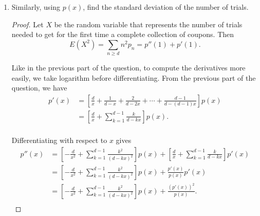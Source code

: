 \documentclass{article}
\begin{document}
\begin{enumerate}[label={(\alph*)}]
\begin{proof}
        Multiplying with $p(x)$ and substituting with $x=1$ give
        \begin{align*}
          \mu_d=p'(1) &=\left[\frac{d}{1} +\frac{1}{d-1} +\frac{2}{d-2}
            +\cdots +\frac{d-1}{d-(d-1)} \right] p(1)\\
          &=\left[d +\sum_{k-1}^{d-1} \frac{k}{d-k}\right] \cdot
            \frac{(d-1)!}{(d-2)(d-1)\cdots2\cdot1}\\
          &=d +\sum_{k=1}^{d-1} \frac{k}{d-k}\\
          &=d +d\sum_{k=1}^{d-1} \frac{1}{d-k} -\sum_{k=1}^{d-1}1\\
          &=1 +d\sum_{k=1}^{d-1} \frac{1}{k}\\
          &=d\sum_{k=1}^{d} \frac{1}{k}\\
          &=dH_d.\\
        \end{align*}
      \end{proof}

    \item Similarly, using $p(x)$, find the standard deviation of the
      number of trials.

      \begin{proof}
        Let $X$ be the random variable that represents the number of trials
        needed to get for the first time a complete collection of coupons.
        Then
        \[E(X^2) =\sum_{n\geq d} n^2p_n =p''(1)+p'(1).\]

        Like in the previous part of the question, to compute the
        derivatives more easily, we take logarithm before differentiating.
        From the previous part of the question, we have
        \begin{align*}
          p'(x) &=\left[\frac{d}{x} +\frac{1}{d-x} +\frac{2}{d-2x}
            +\cdots +\frac{d-1}{d-(d-1)x} \right] p(x)\\
          &=\left[\frac{d}{x} +\sum_{k=1}^{d-1} \frac{k}{d-kx}\right]
            p(x).\\
        \end{align*}

        Differentiating with respect to $x$ gives
        \begin{align*}
          p''(x) &=\left[-\frac{d}{x^2} +\sum_{k=1}^{d-1}
            \frac{k^2}{(d-kx)^2}\right] p(x) + \left[\frac{d}{x}
            +\sum_{k=1}^{d-1} \frac{k}{d-kx}\right] p'(x)\\
          &=\left[-\frac{d}{x^2} +\sum_{k=1}^{d-1}
            \frac{k^2}{(d-kx)^2}\right] p(x) + \frac{p'(x)}{p(x)} p'(x)\\
          &=\left[-\frac{d}{x^2} +\sum_{k=1}^{d-1}
            \frac{k^2}{(d-kx)^2}\right] p(x) + \frac{(p'(x))^2}{p(x)}.\\
        \end{align*}


\end{proof}
\end{enumerate}
\end{document}
